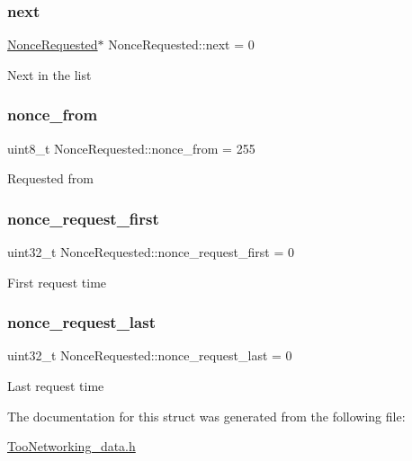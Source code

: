 \subsubsection{\texorpdfstring{next}{next}}
{\footnotesize\ttfamily \hyperlink{structNonceRequested}{Nonce\+Requested}$\ast$ Nonce\+Requested\+::next = 0}

Next in the list \mbox{\label{structNonceRequested_a49d5f4e83fa72e51cc37237cc46f3a7e}} 
\subsubsection{\texorpdfstring{nonce\+\_\+from}{nonce\_from}}
{\footnotesize\ttfamily uint8\+\_\+t Nonce\+Requested\+::nonce\+\_\+from = 255}

Requested from \mbox{\label{structNonceRequested_a9e2f47eec20e01c7cce1acf2d47bbf14}} 
\subsubsection{\texorpdfstring{nonce\+\_\+request\+\_\+first}{nonce\_request\_first}}
{\footnotesize\ttfamily uint32\+\_\+t Nonce\+Requested\+::nonce\+\_\+request\+\_\+first = 0}

First request time \mbox{\label{structNonceRequested_ae5453d115c1ba4044592921e0127f0c8}} 
\subsubsection{\texorpdfstring{nonce\+\_\+request\+\_\+last}{nonce\_request\_last}}
{\footnotesize\ttfamily uint32\+\_\+t Nonce\+Requested\+::nonce\+\_\+request\+\_\+last = 0}

Last request time 

The documentation for this struct was generated from the following file\+:\begin{DoxyCompactItemize}
\item 
\hyperlink{TooNetworking__data_8h}{Too\+Networking\+\_\+data.\+h}\end{DoxyCompactItemize}
